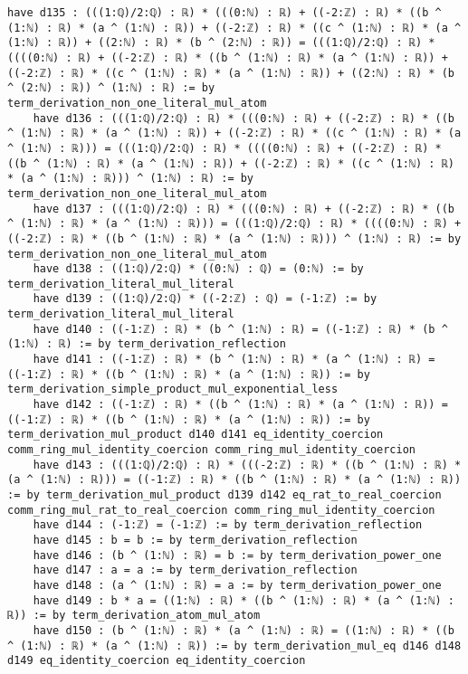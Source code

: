 \documentclass{article}
\begin{document}
\begin{tcolorbox}[colback=white!10, width=\linewidth]
\begin{lstlisting}[language=Lean4]
    have d135 : (((1:ℚ)/2:ℚ) : ℝ) * (((0:ℕ) : ℝ) + ((-2:ℤ) : ℝ) * ((b ^ (1:ℕ) : ℝ) * (a ^ (1:ℕ) : ℝ)) + ((-2:ℤ) : ℝ) * ((c ^ (1:ℕ) : ℝ) * (a ^ (1:ℕ) : ℝ)) + ((2:ℕ) : ℝ) * (b ^ (2:ℕ) : ℝ)) = (((1:ℚ)/2:ℚ) : ℝ) * ((((0:ℕ) : ℝ) + ((-2:ℤ) : ℝ) * ((b ^ (1:ℕ) : ℝ) * (a ^ (1:ℕ) : ℝ)) + ((-2:ℤ) : ℝ) * ((c ^ (1:ℕ) : ℝ) * (a ^ (1:ℕ) : ℝ)) + ((2:ℕ) : ℝ) * (b ^ (2:ℕ) : ℝ)) ^ (1:ℕ) : ℝ) := by term_derivation_non_one_literal_mul_atom
    have d136 : (((1:ℚ)/2:ℚ) : ℝ) * (((0:ℕ) : ℝ) + ((-2:ℤ) : ℝ) * ((b ^ (1:ℕ) : ℝ) * (a ^ (1:ℕ) : ℝ)) + ((-2:ℤ) : ℝ) * ((c ^ (1:ℕ) : ℝ) * (a ^ (1:ℕ) : ℝ))) = (((1:ℚ)/2:ℚ) : ℝ) * ((((0:ℕ) : ℝ) + ((-2:ℤ) : ℝ) * ((b ^ (1:ℕ) : ℝ) * (a ^ (1:ℕ) : ℝ)) + ((-2:ℤ) : ℝ) * ((c ^ (1:ℕ) : ℝ) * (a ^ (1:ℕ) : ℝ))) ^ (1:ℕ) : ℝ) := by term_derivation_non_one_literal_mul_atom
    have d137 : (((1:ℚ)/2:ℚ) : ℝ) * (((0:ℕ) : ℝ) + ((-2:ℤ) : ℝ) * ((b ^ (1:ℕ) : ℝ) * (a ^ (1:ℕ) : ℝ))) = (((1:ℚ)/2:ℚ) : ℝ) * ((((0:ℕ) : ℝ) + ((-2:ℤ) : ℝ) * ((b ^ (1:ℕ) : ℝ) * (a ^ (1:ℕ) : ℝ))) ^ (1:ℕ) : ℝ) := by term_derivation_non_one_literal_mul_atom
    have d138 : ((1:ℚ)/2:ℚ) * ((0:ℕ) : ℚ) = (0:ℕ) := by term_derivation_literal_mul_literal
    have d139 : ((1:ℚ)/2:ℚ) * ((-2:ℤ) : ℚ) = (-1:ℤ) := by term_derivation_literal_mul_literal
    have d140 : ((-1:ℤ) : ℝ) * (b ^ (1:ℕ) : ℝ) = ((-1:ℤ) : ℝ) * (b ^ (1:ℕ) : ℝ) := by term_derivation_reflection
    have d141 : ((-1:ℤ) : ℝ) * (b ^ (1:ℕ) : ℝ) * (a ^ (1:ℕ) : ℝ) = ((-1:ℤ) : ℝ) * ((b ^ (1:ℕ) : ℝ) * (a ^ (1:ℕ) : ℝ)) := by term_derivation_simple_product_mul_exponential_less
    have d142 : ((-1:ℤ) : ℝ) * ((b ^ (1:ℕ) : ℝ) * (a ^ (1:ℕ) : ℝ)) = ((-1:ℤ) : ℝ) * ((b ^ (1:ℕ) : ℝ) * (a ^ (1:ℕ) : ℝ)) := by term_derivation_mul_product d140 d141 eq_identity_coercion comm_ring_mul_identity_coercion comm_ring_mul_identity_coercion
    have d143 : (((1:ℚ)/2:ℚ) : ℝ) * (((-2:ℤ) : ℝ) * ((b ^ (1:ℕ) : ℝ) * (a ^ (1:ℕ) : ℝ))) = ((-1:ℤ) : ℝ) * ((b ^ (1:ℕ) : ℝ) * (a ^ (1:ℕ) : ℝ)) := by term_derivation_mul_product d139 d142 eq_rat_to_real_coercion comm_ring_mul_rat_to_real_coercion comm_ring_mul_identity_coercion
    have d144 : (-1:ℤ) = (-1:ℤ) := by term_derivation_reflection
    have d145 : b = b := by term_derivation_reflection
    have d146 : (b ^ (1:ℕ) : ℝ) = b := by term_derivation_power_one
    have d147 : a = a := by term_derivation_reflection
    have d148 : (a ^ (1:ℕ) : ℝ) = a := by term_derivation_power_one
    have d149 : b * a = ((1:ℕ) : ℝ) * ((b ^ (1:ℕ) : ℝ) * (a ^ (1:ℕ) : ℝ)) := by term_derivation_atom_mul_atom
    have d150 : (b ^ (1:ℕ) : ℝ) * (a ^ (1:ℕ) : ℝ) = ((1:ℕ) : ℝ) * ((b ^ (1:ℕ) : ℝ) * (a ^ (1:ℕ) : ℝ)) := by term_derivation_mul_eq d146 d148 d149 eq_identity_coercion eq_identity_coercion

\end{lstlisting}
\end{tcolorbox}
\end{document}
